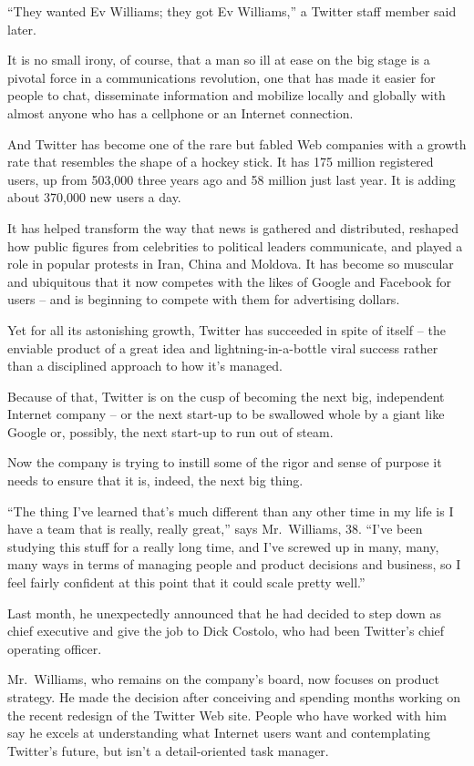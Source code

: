 ﻿\documentclass[12pt]{article}
\begin{document}
``They wanted Ev Williams; they got Ev Williams,'' a Twitter staff member said later.

It is no small irony, of course, that a man so ill at ease on the big stage is a pivotal force in a
communications revolution, one that has made it easier for people to chat, disseminate information
and mobilize locally and globally with almost anyone who has a cellphone or an Internet connection.

And Twitter has become one of the rare but fabled Web companies with a growth rate that resembles
the shape of a hockey stick. It has 175 million registered users, up from 503,000 three years ago
and 58 million just last year. It is adding about 370,000 new users a day.

It has helped transform the way that news is gathered and distributed, reshaped how public figures
from celebrities to political leaders communicate, and played a role in popular protests in Iran,
China and Moldova. It has become so muscular and ubiquitous that it now competes with the likes of
Google and Facebook for users -- and is beginning to compete with them for advertising dollars.

Yet for all its astonishing growth, Twitter has succeeded in spite of itself -- the enviable product
of a great idea and lightning-in-a-bottle viral success rather than a disciplined approach to how
it's managed.

Because of that, Twitter is on the cusp of becoming the next big, independent Internet company -- or
the next start-up to be swallowed whole by a giant like Google or, possibly, the next start-up to
run out of steam.

Now the company is trying to instill some of the rigor and sense of purpose it needs to ensure that
it is, indeed, the next big thing.

``The thing I've learned that's much different than any other time in my life is I have a team that
is really, really great,'' says Mr.~Williams, 38. ``I've been studying this stuff for a really long
time, and I've screwed up in many, many, many ways in terms of managing people and product decisions
and business, so I feel fairly confident at this point that it could scale pretty well.''

Last month, he unexpectedly announced that he had decided to step down as chief executive and give
the job to Dick Costolo, who had been Twitter's chief operating officer.

Mr.~Williams, who remains on the company's board, now focuses on product strategy. He made the
decision after conceiving and spending months working on the recent redesign of the Twitter Web
site. People who have worked with him say he excels at understanding what Internet users want and
contemplating Twitter's future, but isn't a detail-oriented task manager.
\end{document}
